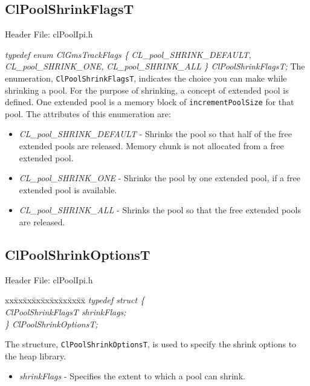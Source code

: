 \begin{flushleft}
\subsection{ClPoolShrinkFlagsT}
\begin{Desc}
\item[Header File:]clPoolIpi.h\end{Desc}
\textit{typedef enum ClGmsTrackFlags \{}
\newline\textit{CL\_\-pool\_\-SHRINK\_\-DEFAULT, }
\newline\textit{CL\_\-pool\_\-SHRINK\_\-ONE, }
\newline\textit{CL\_\-pool\_\-SHRINK\_\-ALL  }
\newline\textit{\} ClPoolShrinkFlagsT;}
\newline
The enumeration, {\tt{ClPoolShrinkFlagsT}}, indicates the
choice you can make while shrinking a pool. For the purpose of shrinking, a concept of extended pool is defined. One extended pool is a memory block of 
{\tt{incrementPoolSize}} for that pool. The attributes of this enumeration are:
\begin{itemize}
\item
\textit{CL\_\-pool\_\-SHRINK\_\-DEFAULT} - Shrinks the pool so that
half of the free extended pools are released. Memory
chunk is not allocated from a free extended pool.
\item
\textit{CL\_\-pool\_\-SHRINK\_\-ONE} - Shrinks the pool by one extended pool, if a free extended pool is available.
\item
\textit{CL\_\-pool\_\-SHRINK\_\-ALL} - Shrinks the pool so that the free extended pools are released.
\end{itemize}




\subsection{ClPoolShrinkOptionsT}
\begin{Desc}
\item[Header File:]clPoolIpi.h\end{Desc}
\begin{tabbing}
xx\=xx\=xx\=xx\=xx\=xx\=xx\=xx\=xx\=\kill
\textit{typedef struct \{}\\
\>\>\>\>\textit{ClPoolShrinkFlagsT  shrinkFlags;}\\
\textit{\} ClPoolShrinkOptionsT;}
\end{tabbing} The structure, {\tt{ClPoolShrinkOptionsT}}, is used to specify the shrink options to the heap library.
\begin{itemize}
\item \textit{shrinkFlags} - Specifies the extent to which a pool can shrink.
\end{itemize}



\end{flushleft}
